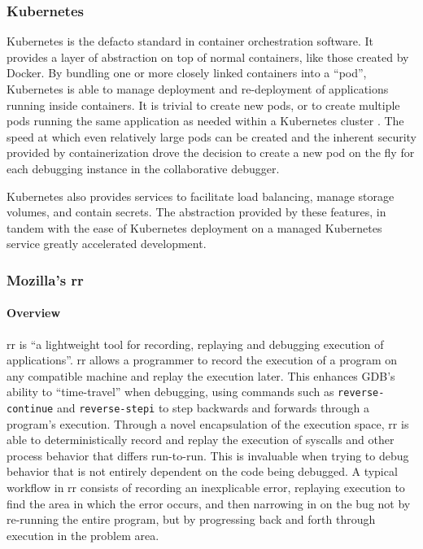 \documentclass[12pt]{article}
\begin{document}
\subsubsection{Kubernetes}\label{k8s}

Kubernetes is the defacto standard in container orchestration
software.  It provides a layer of abstraction on top of normal
containers, like those created by Docker.  By bundling one or more
closely linked containers into a ``pod'', Kubernetes is able to manage
deployment and re-deployment of applications running inside
containers.  It is trivial to create new pods, or to create multiple
pods running the same application as needed within a Kubernetes
cluster \cite{k8s}.  The speed at which even relatively large pods can be created
and the inherent security provided by containerization drove the
decision to create a new pod on the fly for each debugging instance in
the collaborative debugger.
\par

Kubernetes also provides services to facilitate load balancing, manage
storage volumes, and contain secrets.  The abstraction provided by
these features, in tandem with the ease of Kubernetes deployment on a
managed Kubernetes service\cite{do_managed_k8s} greatly accelerated
development.

\subsubsection{Mozilla's rr}\label{rr}

\paragraph{Overview}

rr is ``a lightweight tool for recording, replaying and debugging
execution of applications''\cite{rr-repo}. rr allows a programmer to
record the execution of a program on any compatible machine and replay
the execution later.  This enhances GDB's ability to ``time-travel''
when debugging, using commands such as \lstinline{reverse-continue}
and \lstinline{reverse-stepi}\cite{gdbman} to step backwards and
forwards through a program's execution.  Through a novel encapsulation
of the execution space, rr is able to deterministically record and
replay the execution of syscalls and other process behavior that
differs run-to-run.  This is invaluable when trying to debug behavior
that is not entirely dependent on the code being debugged.  A typical
workflow in rr consists of recording an inexplicable error, replaying
execution to find the area in which the error occurs, and then
narrowing in on the bug not by re-running the entire program, but by
progressing back and forth through execution in the problem area.
\par
\end{document}
